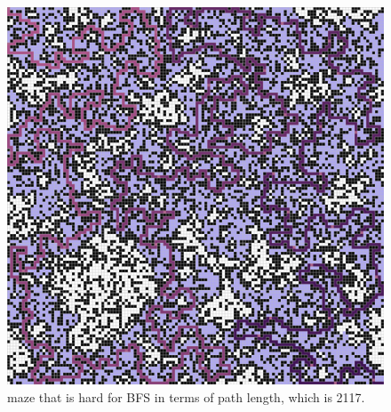 \documentclass[letter]{article}
\begin{document}
\begin{enumerate}[resume]
\begin{enumerate}
\begin{enumerate}
\begin{figure}
					\includegraphics[width=\textwidth]{../pics/bp/2117.png}
					\caption{\label{fig:bp1}maze that is hard for BFS in terms of path length, which is 2117.}
					

\end{figure}
\end{enumerate}
\end{enumerate}
\end{enumerate}
\end{document}
